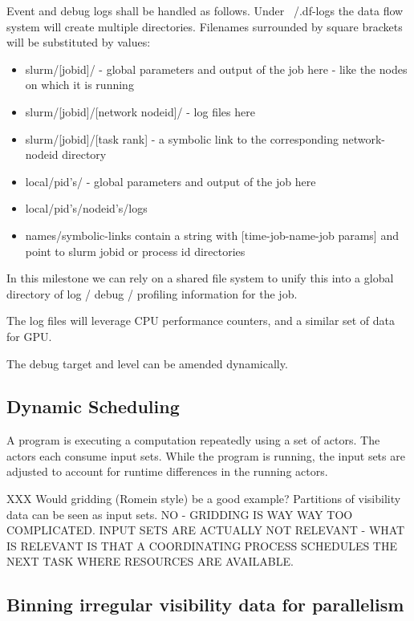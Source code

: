 \documentclass[11pt,a4paper]{article}
\begin{document}
Event and debug logs shall be handled as follows.  Under ~/.df-logs the data flow system will create multiple directories. Filenames surrounded by square brackets will be substituted by values:
\begin{itemize}
    \item slurm/[jobid]/ - global parameters and output of the job here - like the nodes on which it is running
    \item slurm/[jobid]/[network nodeid]/ - log files here
    \item slurm/[jobid]/[task rank] - a symbolic link to the corresponding network-nodeid directory 
    \item local/pid’s/ - global parameters and output of the job here
    \item local/pid’s/nodeid’s/logs
    \item names/symbolic-links contain a string with [time-job-name-job params] and point to slurm jobid or process id directories
\end{itemize}

In this milestone we can rely on a shared file system to unify this into a global directory of log / debug / profiling information for the job.

The log files will leverage CPU performance counters, and a similar set of data for GPU.

The debug target and level can be amended dynamically.

\subsection{Dynamic Scheduling}

A program is executing a computation repeatedly using a set of actors.  The actors each consume input sets.   While the program is running, the input sets are adjusted to account for runtime differences in the running actors.

XXX Would gridding (Romein style) be a good example? Partitions of visibility data can be seen as input sets.  NO - GRIDDING IS WAY WAY TOO COMPLICATED.  INPUT SETS ARE ACTUALLY NOT RELEVANT - WHAT IS RELEVANT IS THAT A COORDINATING PROCESS SCHEDULES THE NEXT TASK WHERE RESOURCES ARE AVAILABLE.

\subsection{Binning irregular visibility data for parallelism}
\end{document}
